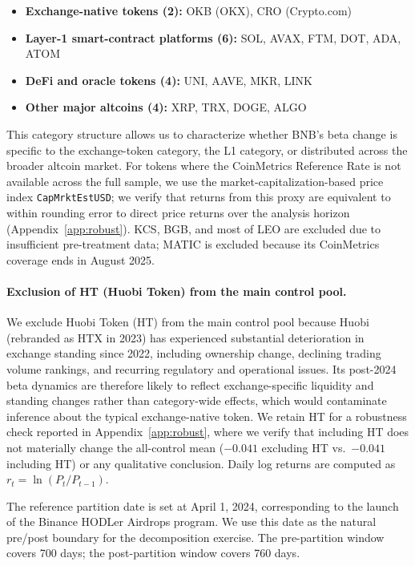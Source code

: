 \documentclass[11pt,a4paper]{article}
\begin{document}
\begin{itemize}
\item \textbf{Exchange-native tokens (2):} OKB (OKX), CRO (Crypto.com)
\item \textbf{Layer-1 smart-contract platforms (6):} SOL, AVAX, FTM, DOT, ADA, ATOM
\item \textbf{DeFi and oracle tokens (4):} UNI, AAVE, MKR, LINK
\item \textbf{Other major altcoins (4):} XRP, TRX, DOGE, ALGO
\end{itemize}

This category structure allows us to characterize whether BNB's beta change is specific to the exchange-token category, the L1 category, or distributed across the broader altcoin market. For tokens where the CoinMetrics Reference Rate is not available across the full sample, we use the market-capitalization-based price index \texttt{CapMrktEstUSD}; we verify that returns from this proxy are equivalent to within rounding error to direct price returns over the analysis horizon (Appendix~\ref{app:robust}). KCS, BGB, and most of LEO are excluded due to insufficient pre-treatment data; MATIC is excluded because its CoinMetrics coverage ends in August 2025.

\paragraph{Exclusion of HT (Huobi Token) from the main control pool.} We exclude Huobi Token (HT) from the main control pool because Huobi (rebranded as HTX in 2023) has experienced substantial deterioration in exchange standing since 2022, including ownership change, declining trading volume rankings, and recurring regulatory and operational issues. Its post-2024 beta dynamics are therefore likely to reflect exchange-specific liquidity and standing changes rather than category-wide effects, which would contaminate inference about the typical exchange-native token. We retain HT for a robustness check reported in Appendix~\ref{app:robust}, where we verify that including HT does not materially change the all-control mean ($-0.041$ excluding HT vs.\ $-0.041$ including HT) or any qualitative conclusion. Daily log returns are computed as $r_t = \ln(P_t / P_{t-1})$.

The reference partition date is set at April 1, 2024, corresponding to the launch of the Binance HODLer Airdrops program. We use this date as the natural pre/post boundary for the decomposition exercise. The pre-partition window covers 700 days; the post-partition window covers 760 days.
\end{document}
